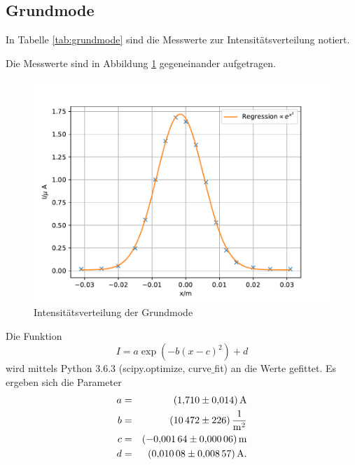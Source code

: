 %
%
\FloatBarrier

\subsection{Grundmode}
In Tabelle \ref{tab:grundmode} sind die Messwerte zur Intensitätsverteilung notiert.

Die Messwerte sind in Abbildung \ref{fig:grundmode} gegeneinander aufgetragen.
\begin{figure}
  \centering
  \includegraphics[width=\textwidth]{grundmode.pdf}
  \caption{Intensitätsverteilung der Grundmode}
  \label{fig:grundmode}
\end{figure}
Die Funktion
\begin{equation*}
  I= a \exp{\left( -b(x-c)^2 \right)}+d
\end{equation*}
wird mittels Python 3.6.3 (scipy.optimize, curve$\_$fit) an die Werte gefittet.
Es ergeben sich die Parameter
\begin{align*}
a &=& \SI{  1.710 \pm 0.014 }{A}\\
b &=& \SI{  10472 \pm 226 }{\frac{1}{m^2}}\\
c &=& \SI{ -0.00164 \pm 0.00006 }{m}\\
d &=& \SI{  0.01008 \pm 0.00857 }{A}.\\
\end{align*}
